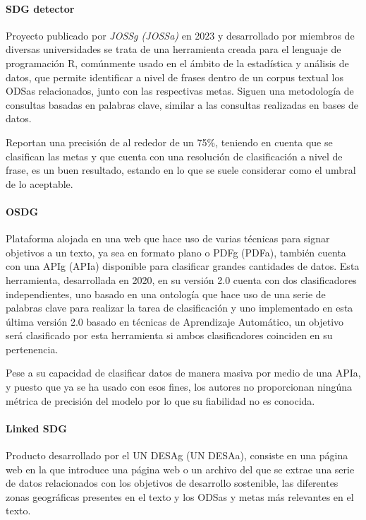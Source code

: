 \paragraph{SDG detector}Proyecto publicado por \textit{\gls{JOSSg} (\gls{JOSSa})} en 2023 y desarrollado por miembros de diversas
universidades se trata de una herramienta creada para el lenguaje de
programación R, comúnmente usado en el ámbito de la estadística y análisis de
datos, que permite identificar a nivel de frases dentro de un corpus textual los
\gls{ODSa}s relacionados, junto con las respectivas metas. Siguen una metodología de
consultas basadas en palabras clave, similar a las consultas realizadas en bases
de datos. \cite{Li2023}

Reportan una precisión de al rededor de un 75\%, teniendo en cuenta que se
clasifican las metas y que cuenta con una resolución de clasificación a nivel de
frase, es un buen resultado, estando en lo que se suele considerar como el
umbral de lo aceptable.  

\paragraph{OSDG} Plataforma alojada en una web que hace
uso de varias técnicas para signar objetivos a un texto, ya sea en formato plano
o \gls{PDFg} (\gls{PDFa}), también cuenta con una \gls{APIg} (\gls{APIa}) disponible para clasificar grandes cantidades
de datos. Esta herramienta, desarrollada en 2020, en su versión 2.0 cuenta con
dos clasificadores independientes, uno basado en una ontología que hace uso de
una serie de palabras clave para realizar la tarea de clasificación y uno
implementado en esta última versión 2.0 basado en técnicas de Aprendizaje Automático,
un objetivo será clasificado por esta herramienta si ambos clasificadores
coinciden en su pertenencia. \cite{OSDG1,OSDG2,OSDGTool}

Pese a su capacidad de clasificar datos de manera masiva por medio de una \gls{APIa}, y
puesto que ya se ha usado con esos fines, los autores no proporcionan ningúna
métrica de precisión del modelo por lo que su fiabilidad no es conocida.

\paragraph{Linked SDG}Producto desarrollado por el \gls{UN DESAg} (\gls{UN DESAa}), consiste en una página web en
la que introduce una página web o un archivo del que se extrae una serie de
datos relacionados con los objetivos de desarrollo sostenible, las diferentes
zonas geográficas presentes en el texto y los \gls{ODSa}s y metas más relevantes en el
texto. \cite{UNSDGLinkedSDGs,UNSDGAbout}

